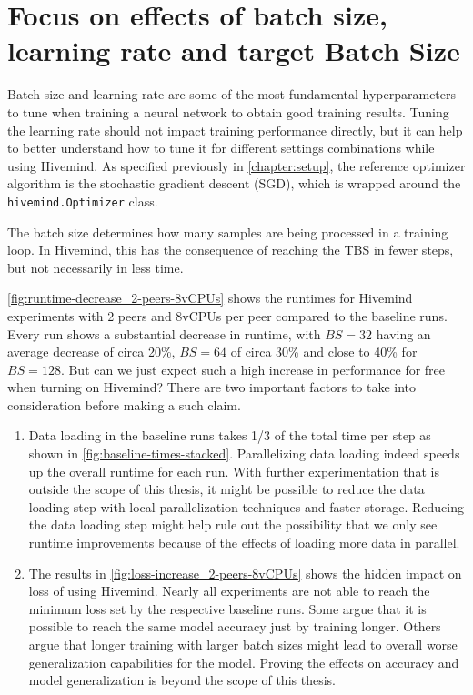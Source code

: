 
\section{Focus on effects of batch size, learning rate and target Batch Size}\label{sec:focus-effect-bs-lr-tbs}

Batch size and learning rate are some of the most fundamental hyperparameters to tune when training a neural network to obtain good training results.
Tuning the learning rate should not impact training performance directly, but it can help to better understand how to tune it for different settings combinations while using Hivemind.
As specified previously in \autoref{chapter:setup}, the reference optimizer algorithm is the stochastic gradient descent (SGD), which is wrapped around the \texttt{hivemind.Optimizer} class.

The batch size determines how many samples are being processed in a training loop.
In Hivemind, this has the consequence of reaching the TBS in fewer steps, but not necessarily in less time.

\autoref{fig:runtime-decrease_2-peers-8vCPUs} shows the runtimes for Hivemind experiments with 2 peers and 8vCPUs per peer compared to the baseline runs.
Every run shows a substantial decrease in runtime, with $BS=32$ having an average decrease of circa 20\%, $BS=64$ of circa 30\% and close to 40\% for $BS=128$.
But can we just expect such a high increase in performance for free when turning on Hivemind?
There are two important factors to take into consideration before making a such claim.

\begin{enumerate}
    \item Data loading in the baseline runs takes 1/3 of the total time per step as shown in \autoref{fig:baseline-times-stacked}.
          Parallelizing data loading indeed speeds up the overall runtime for each run.
          With further experimentation that is outside the scope of this thesis, it might be possible to reduce the data loading step with local parallelization techniques and faster storage.
          Reducing the data loading step might help rule out the possibility that we only see runtime improvements because of the effects of loading more data in parallel.
    \item The results in \autoref{fig:loss-increase_2-peers-8vCPUs} shows the hidden impact on loss of using Hivemind.
          Nearly all experiments are not able to reach the minimum loss set by the respective baseline runs.
          Some argue \cite{DBLP:journals/corr/abs-1708-03888} that it is possible to reach the same model accuracy just by training longer.
          Others \cite{DBLP:journals/corr/KeskarMNST16} argue that longer training with larger batch sizes might lead to overall worse generalization capabilities for the model.
          Proving the effects on accuracy and model generalization is beyond the scope of this thesis.
\end{enumerate}

